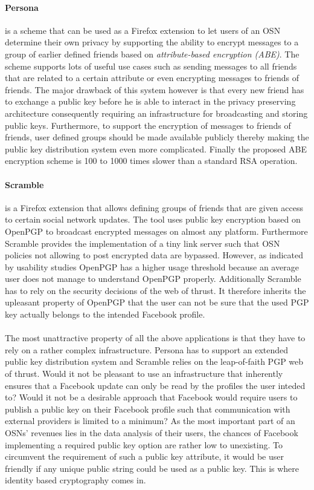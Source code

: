\documentclass[journal]{IEEEtran}
\begin{document}
\paragraph{Persona} is a scheme that can be used as a Firefox extension to let
users of an OSN determine their own privacy by supporting the ability to encrypt
messages to a group of earlier defined friends based on \textit{attribute-based
encryption (ABE)}\cite{SahaiFuzzyIBE}. The scheme supports lots of useful use
cases such as sending messages to all friends that are related to a certain
attribute or even encrypting messages to friends of friends. The major drawback
of this system however is that every new friend has to exchange a public key
before he is able to interact in the privacy preserving architecture
consequently requiring an infrastructure for broadcasting and storing public
keys. Furthermore, to support the encryption of messages to friends of friends,
user defined groups should be made available publicly thereby making the public
key distribution system even more complicated. Finally the proposed ABE
encryption scheme is 100 to 1000 times slower than a standard RSA operation.
\cite{BadenPersona} 

\paragraph{Scramble} is a Firefox extension that allows defining groups of
friends that are given access to certain social network updates. The tool uses
public key encryption based on OpenPGP \cite{rfc4880} to broadcast encrypted
messages on almost any platform. Furthermore Scramble provides the
implementation of a tiny link server such that OSN policies not allowing to post
encrypted data are bypassed. However, as indicated by usability studies
\cite{WhittenJohnny} OpenPGP has a higher usage threshold because an average
user does not manage to understand OpenPGP properly. Additionally Scramble has
to rely on the security decisions of the web of thrust. It therefore inherits
the upleasant property of OpenPGP that the user can not be sure that the used
PGP key actually belongs to the intended Facebook profile.\cite{BeatoScramble}\\
\\
The most unattractive property of all the above applications is that they have
to rely on a rather complex infrastructure. Persona has to support an extended
public key distribution system and Scramble relies on the leap-of-faith PGP web
of thrust. Would it not be pleasant to use an infrastructure that inherently
ensures that a Facebook update can only be read by the profiles the user
inteded to? Would it not be a desirable approach that Facebook would require
users to publish a public key on their Facebook profile such that communication
with external providers is limited to a minimum? As the most important part of
an OSNs' revenues lies in the data analysis of their users, the chances of
Facebook implementing a required public key option are rather low to
unexisting. To circumvent the requirement of such a public key attribute, it
would be user friendly if any unique public string could be used as a public
key. This is where identity based cryptography comes in.
\end{document}
